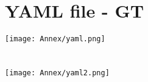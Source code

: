 \chapter{YAML file - GT}\label{annex:yaml}
\texttt{[image: Annex/yaml.png]}
\chapter*{ }
\texttt{[image: Annex/yaml2.png]}
